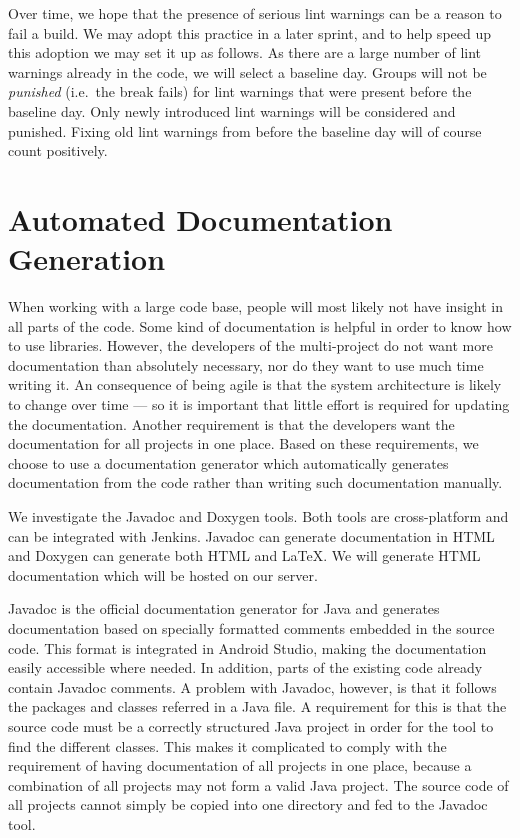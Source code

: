 Over time, we hope that the presence of serious lint warnings can be a reason to fail a build. We may adopt this practice in a later sprint, and to help speed up this adoption we may set it up as follows. As there are a large number of lint warnings already in the code, we will select a baseline day. Groups will not be \emph{punished} (i.e.\ the break fails) for lint warnings that were present before the baseline day. Only newly introduced lint warnings will be considered and punished. Fixing old lint warnings from before the baseline day will of course count positively. %



\section{Automated Documentation Generation}\label{sec:automated_documentation_gen}
When working with a large code base, people will most likely not have insight in all parts of the code. Some kind of documentation is helpful in order to know how to use libraries. However, the developers of the multi-project do not want more documentation than absolutely necessary, nor do they want to use much time writing it. An consequence of being agile is that the system architecture is likely to change over time --- so it is important that little effort is required for updating the documentation. Another requirement is that the developers want the documentation for all projects in one place. Based on these requirements, we choose to use a documentation generator which automatically generates documentation from the code rather than writing such documentation manually.

We investigate the Javadoc \parencite{javadoc} and Doxygen \parencite{doxygen} tools. Both tools are cross-platform and can be integrated with Jenkins. Javadoc can generate documentation in HTML and Doxygen can generate both HTML and \LaTeX. We will generate HTML documentation which will be hosted on our server.

Javadoc is the official documentation generator for Java and generates documentation based on specially formatted comments embedded in the source code. This format is integrated in Android Studio, making the documentation easily accessible where needed. In addition, parts of the existing code already contain Javadoc comments. A problem with Javadoc, however, is that it follows the packages and classes referred in a Java file. A requirement for this is that the source code must be a correctly structured Java project in order for the tool to find the different classes. This makes it complicated to comply with the requirement of having documentation of all projects in one place, because a combination of all projects may not form a valid Java project. The source code of all projects cannot simply be copied into one directory and fed to the Javadoc tool.

